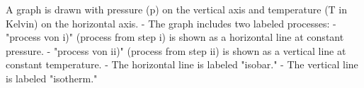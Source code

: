 A graph is drawn with pressure (p) on the vertical axis and temperature (T in Kelvin) on the horizontal axis.  
- The graph includes two labeled processes:  
  - "process von i)" (process from step i) is shown as a horizontal line at constant pressure.  
  - "process von ii)" (process from step ii) is shown as a vertical line at constant temperature.  
- The horizontal line is labeled "isobar."  
- The vertical line is labeled "isotherm."